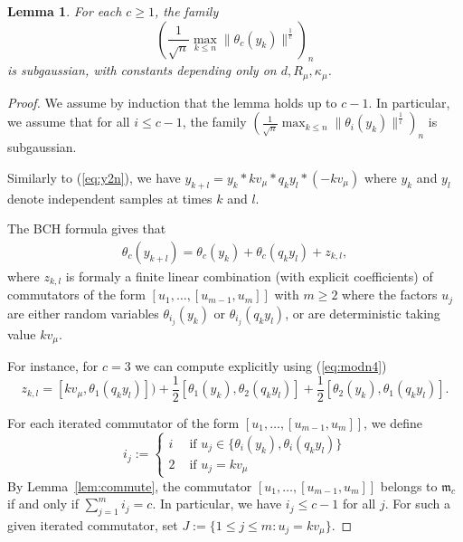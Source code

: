 \documentclass[11pt,leqno]{article}
\theoremstyle{plain}
\newtheorem{lemma}[theorem]{Lemma}
\theoremstyle{definition}
\theoremstyle{remark}
\numberwithin{equation}{section}
\begin{document}


\begin{lemma}\label{lem:theta3y} For each $c\ge 1$, the family
\[
\left(\frac{1}{\sqrt{n}} \max_{k \le n}\|\theta_c(y_k)\|^{\frac{1}{c}}\right)_n
\]
is subgaussian, with constants depending only on $d, R_\mu, \kappa_\mu$.
\end{lemma}

\begin{proof} 
We assume by induction that the lemma holds up to $c-1$. In particular, we assume that for all $i \le c-1$, the family $\left(\frac{1}{\sqrt{n}} \max_{k \le n}\|\theta_i(y_k)\|^{\frac{1}{i}}\right)_n$ is subgaussian.


Similarly to (\ref{eq:y2n}), we have $y_{k+l}=y_k \ast kv_\mu\ast  q_k y_l \ast(-kv_\mu)$ where $y_k$ and $y_l$ denote independent samples at times $k$ and $l$.

The BCH formula gives that
\begin{align}\label{eq:ykl}
\theta_c(y_{k+l})=\theta_c(y_k)+\theta_{c}(q_k y_l) + z_{k,l},
\end{align}
where $z_{k,l}$ is formaly a finite linear combination (with explicit coefficients) of commutators of the form $[u_1,\dots,[u_{m-1},u_m]]$ with $m\ge 2$ where the factors $u_j$ are either random variables $\theta_{i_j}(y_k)$ or $\theta_{i_j}(q_ky_l)$, or are deterministic taking value $ k v_\mu$. 

For instance, for $c=3$ we can compute explicitly using (\ref{eq:modn4})
\[
z_{k,l}=[kv_\mu, \theta_1(q_k y_l)])+\frac{1}{2}[\theta_1(y_{k}),\theta_2(q_{k}y_l)]+\frac{1}{2}[\theta_2(y_{k}),\theta_1(q_{k}y_l)].
\]


For each iterated commutator of the form $[u_1,\dots,[u_{m-1},u_m]]$, we define
\[
i_j :=\left\{ \begin{array}{ll} 
i & \textrm{ if } u_j \in \{\theta_i(y_k),\theta_i(q_ky_l)\} \\
2 & \textrm{ if } u_j =kv_\mu
\end{array}\right.
\]
By Lemma~\ref{lem:commute}, the commutator $[u_1,\dots,[u_{m-1},u_m]]$ belongs to $\mathfrak{m}_{c}$ if and only if $\sum_{j=1}^m i_j=c$. In particular, we  have $i_j \le c-1$ for all $j$. For such a given iterated commutator, set $J:=\{1\le j \le m: u_j=kv_\mu\}$.



\end{proof}
\end{document}

